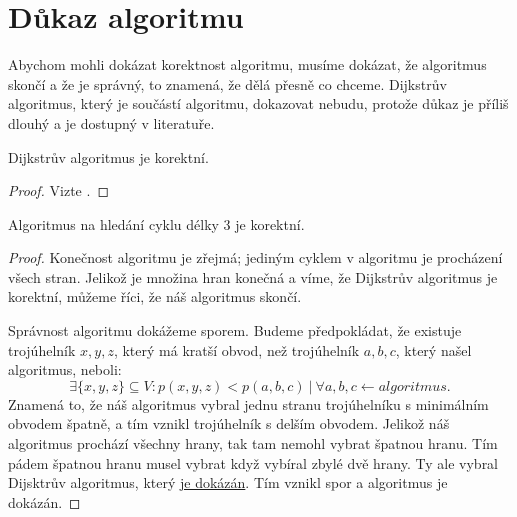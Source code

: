 \section{Důkaz algoritmu}
\label{dukaz_algoritmu}

Abychom mohli dokázat korektnost algoritmu, musíme dokázat, že algoritmus skončí a že je správný, to znamená, že dělá přesně co chceme. Dijkstrův algoritmus, který je součástí algoritmu, dokazovat nebudu, protože důkaz je příliš dlouhý a je dostupný v literatuře.
\begin{tvrzeni}
    \label{tvrzeni:dijkstra}
    Dijkstrův algoritmus je korektní.
\end{tvrzeni}
\begin{proof}
    \label{dukaz:dijkstra}
    Vizte \autocite[113]{benlFormalCorrectnessProofs1999}.
\end{proof}
\begin{tvrzeni}
    \label{tvrzeni:algoritmus}
    Algoritmus na hledání cyklu délky 3 je korektní.
\end{tvrzeni}
\begin{proof}
    \label{dukaz:algoritmus}
Konečnost algoritmu je zřejmá; jediným cyklem v algoritmu je procházení všech stran. Jelikož je množina hran konečná a víme, že Dijkstrův algoritmus je korektní, můžeme říci, že náš algoritmus skončí.

Správnost algoritmu dokážeme sporem. Budeme předpokládat, že existuje trojúhelník $x, y, z$, který má kratší obvod, než trojúhelník $a, b, c$, který našel algoritmus, neboli:
\begin{equation*}
    \exists \{x, y, z\}\subseteq V: p(x, y, z) < p(a, b, c)~|~\forall a, b, c \leftarrow algoritmus.
\end{equation*}
Znamená to, že náš algoritmus vybral jednu stranu trojúhelníku s minimálním obvodem špatně, a tím vznikl trojúhelník s delším obvodem. Jelikož náš algoritmus prochází všechny hrany, tak tam nemohl vybrat špatnou hranu. Tím pádem špatnou hranu musel vybrat když vybíral zbylé dvě hrany. Ty ale vybral Dijsktrův algoritmus, který \hyperref[dukaz:dijkstra]{je dokázán}. Tím vznikl spor a algoritmus je dokázán. 
\end{proof}